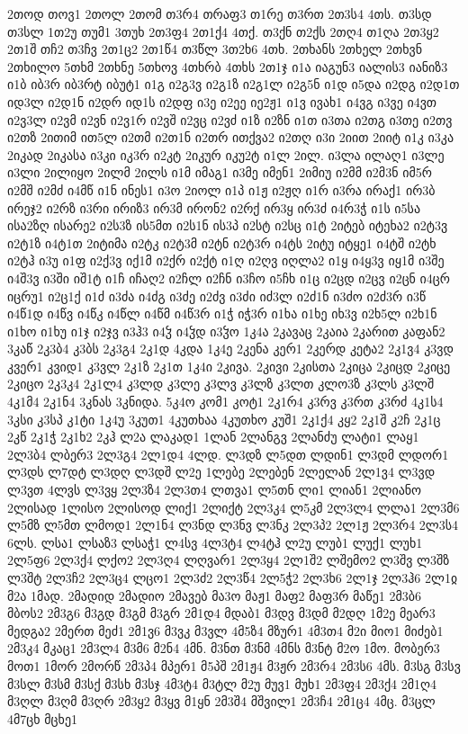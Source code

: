 {2თოდ
თოვ1
2თოლ
2თომ
თ3რ4
თრაფ3
თ1რე
თ3რთ
2თ3ს4
4თს.
თ3სდ
თ3სლ
1თ2უ
თუმ1
3თუხ
2თ3ფ4
2თ1ქ4
4თქ.
თ3ქნ
თ2ქს
2თღ4
თ1ღა
2თ3ყ2
2თ1შ
თჩ2
თ3ჩვ
2თ1ც2
2თ1წ4
თ3წლ
3თ2ხ6
4თხ.
2თხანს
2თხელ
2თხვნ
2თხილო
5თხმ
2თხნე
5თხოვ
4თხრბ
4თხს
2თ1ჯ
ი1ა
იაგუნ3
იალის3
იანიზ3
ი1ბ
იბ3რ
იბ3რტ
იბუტ1
ი1გ
ი2გ3ვ
ი2გ1ზ
ი2გ1ლ
ი2გ5ნ
ი1დ
ი5და
ი2დგ
ი2დ1თ
იდ3ლ
ი2დ1ნ
ი2დრ
იდ1ს
ი2დფ
ი3ე
ი2ეე
იე2ჟ1
ი1ვ
ივახ1
ი4ვგ
ი3ვე
ი4ვთ
ი2ვ3ლ
ი2ვმ
ი2ვნ
ი2ვ1რ
ი2ვშ
ი2ვც
ი2ვძ
ი1ზ
ი2ზნ
ი1თ
ი3თა
ი2თგ
ი3თე
ი2თვ
ი2თზ
2ითიმ
ით5ლ
ი2თმ
ი2თ1ნ
ი2თრ
ითქვა2
ი2თღ
ი3ი
2იით
2იიტ
ი1კ
ი3კა
2იკად
2იკასა
ი3კი
იკ3რ
ი2კტ
2იკურ
იკუ2ტ
ი1ლ
2ილ.
ი3ლა
ილაღ1
ი3ლე
ი3ლი
2ილიყო
2ილმ
2ილს
ი1მ
იმაგ1
ი3მე
იმენ1
2იმიუ
ი2მმ
ი2მ3ნ
იმ5რ
ი2მშ
ი2მძ
ი4მწ
ი1ნ
ინეს1
ი3ო
2იოლ
ი1პ
ი1ჟ
ი2ჟღ
ი1რ
ი3რა
ირაქ1
ირ3ბ
ირეჯ2
ი2რზ
ი3რი
ირიზ3
ირ3მ
ირონ2
ი2რქ
ირ3ყ
ირ3ძ
ი4რ3ჭ
ი1ს
ი5სა
ისა2ზღ
ისარე2
ი2ს3ზ
ის5მთ
ი2ს1ნ
ის3პ
ი2სტ
ი2სც
ი1ტ
2იტებ
იტეხა2
ი2ტ3ვ
ი2ტ1ზ
ი4ტ1თ
2იტიმა
ი2ტკ
ი2ტ3მ
ი2ტნ
ი2ტ3რ
ი4ტს
2იტუ
იტყე1
ი4ტშ
ი2ტხ
ი2ტჰ
ი3უ
ი1ფ
ი2ქ3ვ
იქ1მ
ი2ქრ
ი2ქტ
ი1ღ
ი2ღვ
იღლა2
ი1ყ
ი4ყ3ვ
იყ1მ
ი3შე
ი4შ3ვ
ი3ში
იშ1ტ
ი1ჩ
იჩაღ2
ი2ჩლ
ი2ჩნ
ი3ჩო
ი5ჩხ
ი1ც
ი2ცდ
ი2ცვ
ი2ცნ
ი4ცრ
იცრუ1
ი2ც1ქ
ი1ძ
ი3ძა
ი4ძგ
ი3ძე
ი2ძვ
ი3ძი
იძ3ლ
ი2ძ1ნ
ი3ძო
ი2ძ3რ
ი3წ
ი4წ1დ
ი4წვ
ი4წკ
ი4წლ
ი4წმ
ი4წ3რ
ი1ჭ
იჭ3რ
ი1ხა
ი1ხე
იხ3ვ
ი2ხ5ლ
ი2ხ1ნ
ი1ხო
ი1ხუ
ი1ჯ
ი2ჯვ
ი3ჰ3
ი4ჴ
ი4ჴდ
ი3ჴო
1კ4ა
2კავაც
2კაია
2კარით
კაფან2
3კაწ
2კ3ბ4
კ3ბს
2კ3გ4
2კ1დ
4კდა
1კ4ე
2კენა
კერ1
2კერდ
კეტა2
2კ1ვ4
კ3ვდ
კვერ1
კვიდ1
კ3ვლ
2კ1ზ
2კ1თ
1კ4ი
2კივა.
2კივი
2კისთა
2კიცა
2კიცდ
2კიცე
2კიცო
2კ3კ4
2კ1ლ4
კ3ლდ
კ3ლე
კ3ლვ
კ3ლზ
კ3ლთ
კლო3ზ
კ3ლს
კ3ლშ
4კ1მ4
2კ1ნ4
3კნას
3კნიდა.
5კ4ო
კომ1
კოტ1
2კ1რ4
კ3რვ
კ3რთ
კ3რძ
4კ1ს4
3კსი
კ3სპ
კ1ტი
1კ4უ
3კუთ1
4კუთხაა
4კუთხო
კუშ1
2კ1ქ4
კყ2
2კ1შ
კ2ჩ
2კ1ც
2კწ
2კ1ჭ
2კ1ხ2
2კჰ
ლ2ა
ლაკად1
1ლან
2ლანგვ
2ლანძუ
ლატი1
ლაყ1
2ლ3ბ4
ლბერ3
2ლ3გ4
2ლ1დ4
4ლდ.
ლ3დზ
ლ5დთ
ლდინ1
ლ3დმ
ლდორ1
ლ3დს
ლ7დტ
ლ3დღ
ლ3დშ
ლ2ე
1ლებე
2ლებენ
2ლელან
2ლ1ვ4
ლ3ვდ
ლ3ვთ
4ლვს
ლ3ვყ
2ლ3ზ4
2ლ3თ4
ლთვა1
ლ5თნ
ლი1
ლიან1
2ლიანო
2ლისად
1ლისო
2ლისოდ
ლიქ1
2ლიქტ
2ლ3კ4
ლ5კმ
2ლ3ლ4
ლლა1
2ლ3მ6
ლ5მზ
ლ5მთ
ლმოდ1
2ლ1ნ4
ლ3ნდ
ლ3ნვ
ლ3ნკ
2ლ3პ2
2ლ1ჟ
2ლ3რ4
2ლ3ს4
6ლს.
ლსა1
ლსაზ3
ლსაჭ1
ლ4სვ
4ლ3ტ4
ლ4ტჰ
ლ2უ
ლუბ1
ლუქ1
ლუხ1
2ლ5ფ6
2ლ3ქ4
ლქო2
2ლ3ღ4
ლღვარ1
2ლ3ყ4
2ლ1შ2
ლშემო2
ლ3შვ
ლ3შზ
ლ3შტ
2ლ3ჩ2
2ლ3ც4
ლცო1
2ლ3ძ2
2ლ3წ4
2ლ5ჭ2
2ლ3ხ6
2ლ1ჯ
2ლ3ჰ6
2ლ1ჲ
მ2ა
1მად.
2მადიდ
2მადიო
2მავებ
მა3ო
მაჟ1
მაფ2
მაფ3რ
მაწე1
2მ3ბ6
მბოს2
2მ3გ6
მ3გდ
მ3გმ
მ3გრ
2მ1დ4
მდაბ1
მ3დვ
მ3დმ
მ2დღ
1მ2ე
მეარ3
მედგა2
2მერთ
მეძ1
2მ1ვ6
მ3ვკ
მ3ვლ
4მ5ზ4
მზურ1
4მ3თ4
მ2ი
მიო1
მიძებ1
2მ3კ4
მკაც1
2მ3ლ4
მ3მ6
მ2ნ4
4მნ.
მ3ნთ
მ3ნმ
4მნს
მ3ნტ
მ2ო
1მო.
მობერ3
მოთ1
1მორ
2მორწ
2მ3პ4
მპერ1
მ5პშ
2მ1ჟ4
მ3ჟრ
2მ3რ4
2მ3ს6
4მს.
მ3სგ
მ3სვ
მ3სლ
მ3სმ
მ3სქ
მ3სხ
მ3სჯ
4მ3ტ4
მ3ტლ
მ2უ
მუვ1
მუხ1
2მ3ფ4
2მ3ქ4
2მ1ღ4
მ3ღლ
მ3ღმ
მ3ღრ
2მ3ყ2
მ3ყვ
მ1ყნ
2მ3შ4
მშვილ1
2მ3ჩ4
2მ1ც4
4მც.
მ3ცლ
4მ7ცხ
მცხე1
}
